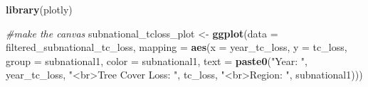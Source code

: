 \documentclass[
]{article}
\newenvironment{Shaded}{\begin{snugshade}}{\end{snugshade}}
\newcommand{\AttributeTok}[1]{\textcolor[rgb]{0.13,0.29,0.53}{#1}}
\newcommand{\CommentTok}[1]{\textcolor[rgb]{0.56,0.35,0.01}{\textit{#1}}}
\newcommand{\FunctionTok}[1]{\textcolor[rgb]{0.13,0.29,0.53}{\textbf{#1}}}
\newcommand{\NormalTok}[1]{#1}
\newcommand{\OtherTok}[1]{\textcolor[rgb]{0.56,0.35,0.01}{#1}}
\newcommand{\StringTok}[1]{\textcolor[rgb]{0.31,0.60,0.02}{#1}}
\begin{document}
\begin{Shaded}
\begin{Highlighting}[]
\FunctionTok{library}\NormalTok{(plotly)}

\CommentTok{\#make the canvas}
\NormalTok{subnational\_tcloss\_plot }\OtherTok{\textless{}{-}} \FunctionTok{ggplot}\NormalTok{(}\AttributeTok{data =}\NormalTok{ filtered\_subnational\_tc\_loss, }\AttributeTok{mapping =}
         \FunctionTok{aes}\NormalTok{(}\AttributeTok{x =}\NormalTok{ year\_tc\_loss, }\AttributeTok{y =}\NormalTok{ tc\_loss, }\AttributeTok{group =} 
\NormalTok{               subnational1, }\AttributeTok{color =}\NormalTok{ subnational1, }\AttributeTok{text =} \FunctionTok{paste0}\NormalTok{(}\StringTok{"Year: "}\NormalTok{, year\_tc\_loss,}
              \StringTok{"\textless{}br\textgreater{}Tree Cover Loss: "}\NormalTok{, tc\_loss, }
              \StringTok{"\textless{}br\textgreater{}Region: "}\NormalTok{, subnational1)))  }


\end{Highlighting}
\end{Shaded}
\end{document}
